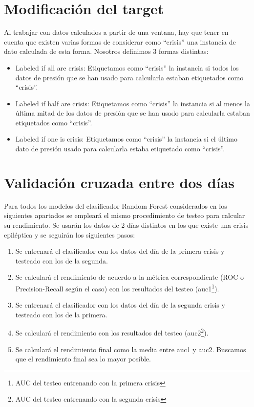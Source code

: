 \documentclass[a4paper,12pt,twoside,oldfontcommands]{memoir}
\begin{document}
\section{Modificación del target}
Al trabajar con datos calculados a partir de una ventana, hay que tener en cuenta que existen varias formas de considerar como ``crisis'' una instancia de dato calculada de esta forma. Nosotros definimos 3 formas distintas: 

\begin{itemize}
    \item Labeled if all are crisis: Etiquetamos como ``crisis'' la instancia si todos los datos de presión que se han usado para calcularla estaban etiquetados como ``crisis''. 
    \item Labeled if half are crisis: Etiquetamos como ``crisis'' la instancia si al menos la última mitad de los datos de presión que se han usado para calcularla estaban etiquetados como ``crisis''. 
    \item Labeled if one is crisis: Etiquetamos como ``crisis'' la instancia si el último dato de presión usado para calcularla estaba etiquetado como ``crisis''. 
\end{itemize}

\section{Validación cruzada entre dos días}\label{rf1}

Para todos los modelos del clasificador Random Forest considerados en los siguientes apartados se empleará el mismo procedimiento de testeo para calcular su rendimiento. Se usarán los datos de 2 días distintos en los que existe una crisis epiléptica y se seguirán los siguientes pasos: 

\begin{enumerate}
    \item Se entrenará el clasificador con los datos del día de la primera crisis y testeado con los de la segunda. 
    \item Se calculará el rendimiento de acuerdo a la métrica correspondiente (ROC o Precision-Recall según el caso) con los resultados del testeo (auc1\footnote{AUC del testeo entrenando con la primera crisis}). 
    \item Se entrenará el clasificador con los datos del día de la segunda crisis y testeado con los de la primera. 
    \item Se calculará el rendimiento con los resultados del testeo (auc2\footnote{AUC del testeo entrenando con la segunda crisis}). 
    \item Se calculará el rendimiento final como la media entre auc1 y auc2. Buscamos que el rendimiento final sea lo mayor posible. 
\end{enumerate}
\end{document}
